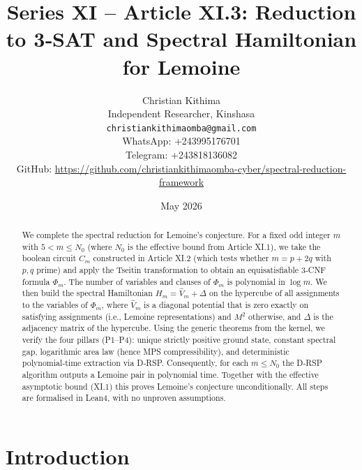 \documentclass[11pt,a4paper]{article}
\title{Series XI – Article XI.3: Reduction to 3‑SAT and Spectral Hamiltonian for Lemoine}
\author{Christian Kithima \\
Independent Researcher, Kinshasa \\
\texttt{christiankithimaomba@gmail.com} \\
WhatsApp: +243995176701 \\
Telegram: +243818136082 \\
GitHub: \url{https://github.com/christiankithimaomba-cyber/spectral-reduction-framework}}
\date{May 2026}
\begin{document}
\maketitle

\begin{abstract}
We complete the spectral reduction for Lemoine's conjecture. For a fixed odd integer \(m\) with \(5<m\le N_0\) (where \(N_0\) is the effective bound from Article XI.1), we take the boolean circuit \(C_m\) constructed in Article XI.2 (which tests whether \(m=p+2q\) with \(p,q\) prime) and apply the Tseitin transformation to obtain an equisatisfiable 3‑CNF formula \(\Phi_m\). The number of variables and clauses of \(\Phi_m\) is polynomial in \(\log m\). We then build the spectral Hamiltonian \(H_m = \hat{V}_m + \Delta\) on the hypercube of all assignments to the variables of \(\Phi_m\), where \(\hat{V}_m\) is a diagonal potential that is zero exactly on satisfying assignments (i.e., Lemoine representations) and \(M^2\) otherwise, and \(\Delta\) is the adjacency matrix of the hypercube. Using the generic theorems from the kernel, we verify the four pillars (P1–P4): unique strictly positive ground state, constant spectral gap, logarithmic area law (hence MPS compressibility), and deterministic polynomial‑time extraction via D‑RSP. Consequently, for each \(m\le N_0\) the D‑RSP algorithm outputs a Lemoine pair in polynomial time. Together with the effective asymptotic bound (XI.1) this proves Lemoine's conjecture unconditionally. All steps are formalised in Lean4, with no unproven assumptions.
\end{abstract}

\tableofcontents

\section{Introduction}
\end{document}
